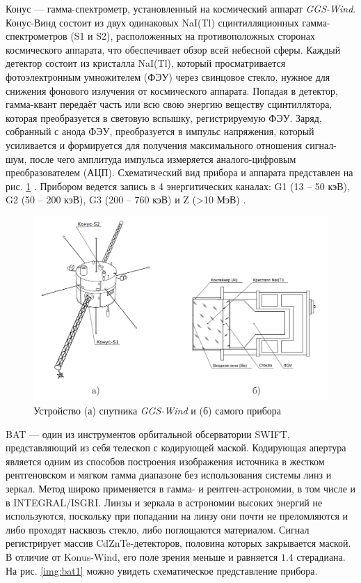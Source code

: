 	Конус --- гамма-спектрометр, установленный на космический аппарат \textit{GGS-Wind}. Конус-Винд состоит из двух одинаковых NaI(Tl) сцинтилляционных гамма-спектрометров (S1 и S2), расположенных на противоположных сторонах космического аппарата, что обеспечивает обзор всей небесной сферы. Каждый детектор состоит из кристалла NaI(Tl), который  просматривается фотоэлектронным умножителем (ФЭУ) через свинцовое стекло, нужное для снижения фонового излучения от космического аппарата. Попадая в детектор, гамма-квант передаёт часть или всю свою энергию
веществу сцинтиллятора, которая преобразуется в световую вспышку, регистрируемую ФЭУ. Заряд, собранный с анода ФЭУ, преобразуется в импульс напряжения, который усиливается и формируется для получения максимального отношения сигнал-шум, после чего амплитуда импульса измеряется аналого-цифровым преобразователем (АЦП). Схематический вид прибора и аппарата представлен на рис. \ref{img:kw1} \cite{Svinkin_thesis}. Прибором ведется запись в 4 энергитических каналах: G1 (13 -- 50 кэВ), G2 (50 -- 200 кэВ), G3 (200 -- 760 кэВ) и Z (>10 МэВ) \cite{aptekarr.l.1993}.

	\begin{figure}[h!]
		\centering
		\includegraphics[width = 0.75\linewidth]{pictures/Konus-Wind.png}
		\caption{Устройство (а) спутника \textit{GGS-Wind} и (б) самого прибора}
		\label{img:kw1}
	\end{figure}
	
	BAT --- один из инструментов орбитальной обсерватории SWIFT, представляющий из себя телескоп с кодирующей маской. Кодирующая апертура является одним из способов построения изображения источника в жестком рентгеновском и мягком гамма диапазоне без использования системы линз и зеркал. Метод широко применяется в гамма- и рентген-астрономии, в том числе и в INTEGRAL/ISGRI. Линзы и зеркала в астрономии высоких энергий не используются, поскольку при попадании на линзу они почти не преломляются и либо проходят насквозь стекло, либо поглощаются материалом. Сигнал регистрирует массив CdZnTe-детекторов, половина которых закрывается маской. В отличие от Konus-Wind, его поле зрения меньше и равняется $1.4$ стерадиана. На рис. \ref{img:bat1} можно увидеть схематическое представление прибора.
	 
